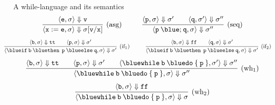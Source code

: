 \documentclass{beamer}
\begin{document}
\begin{frame}{A while-language and its semantics}
        \[
                \infer[(\text{asg})]{
                        \langle \mathtt{x := e}, \sigma \rangle \Downarrow 
                        \sigma[\mathtt{v} / \mathtt{x}]
                }{
                       \langle \mathtt{e}, \sigma \rangle \Downarrow \mathtt{v}
                } \hspace{1cm}
                \infer[(\text{seq})]{
                        \langle \mathtt{p \> {\blue ;} \> q}, \sigma \rangle \Downarrow \sigma''
                }{
                        \langle \mathtt{p}, \sigma \rangle \Downarrow \sigma' \qquad
                        \langle \mathtt{q}, \sigma' \rangle \Downarrow \sigma'' 
                }
        \]\vspace{0.001cm}
        \[\hspace{-0.6cm}
                \infer[(\text{if$_1$})]{
                        \langle \mathtt{{\blue if} \> b \> {\blue then} \> \> p \> {\blue else} \> q}, 
                        \sigma \rangle \Downarrow \sigma'
                }{
                        \langle \mathtt{b}, \sigma \rangle \Downarrow \mathtt{tt} \qquad
                        \langle \mathtt{p}, \sigma \rangle \Downarrow \sigma'
                } \hspace{1cm} 
                \infer[(\text{if$_2$})]{
                        \langle \mathtt{{\blue if} \> b \> {\blue then} \> \> p \> {\blue else} \> q}, 
                        \sigma \rangle \Downarrow \sigma'
                }{
                        \langle \mathtt{b}, \sigma \rangle \Downarrow \mathtt{ff} \qquad
                        \langle \mathtt{q}, \sigma \rangle \Downarrow \sigma'
                } 
        \]\vspace{0.001cm}
        \[
                \infer[(\text{wh$_1$})]{
                        \langle \mathtt{{\blue while} \> b \> {\blue do} \> \{ \> p \> \}}, \sigma \rangle
                        \Downarrow \sigma''
                }{
                        \langle \mathtt{b}, \sigma \rangle \Downarrow \mathtt{tt} \qquad
                        \langle \mathtt{p}, \sigma \rangle \Downarrow \sigma' \qquad
                        \langle \mathtt{{\blue while} \> b \> {\blue do} \> \{ \> p \> \}}, \sigma'
                        \rangle \Downarrow \sigma'' 
                }
        \]\vspace{0.001cm}
        \[
                \infer[(\text{wh$_2$})]{
                        \langle \mathtt{{\blue while} \> b \> {\blue do} \> \{ \> p \> \}}, \sigma \rangle
                        \Downarrow \sigma
                }{
                        \langle \mathtt{b}, \sigma \rangle \Downarrow \mathtt{ff}
                }
        \]
\end{frame}
\end{document}
